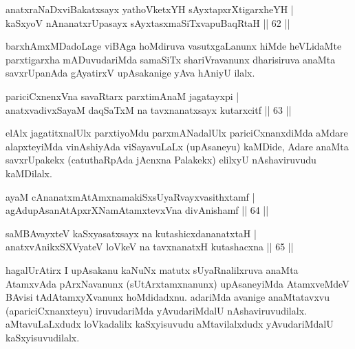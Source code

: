
\begin{shl}
anatxraNaDxviBakatxsayx yathoVketxYH sAyxtapxrXtigarxheYH | \\
kaSxyoV nAnanatxrUpasayx sAyxtasxmaSiTxvapuBaqRtaH \hfill||  62 || 
\end{shl}

\begin{artha} 
barxhAmxMDadoLage viBAga hoMdiruva vasutxgaLanunx hiMde heVLidaMte 
parxtigarxha mADuvudariMda samaSiTx shariVravanunx dharisiruva anaMta 
savxrUpanAda gAyatirxV upAsakanige yAva hAniyU ilalx.
\end{artha}


\begin{shl}
pariciCxnenxVna savaRtarx parxtimAnaM jagatayxpi | \\
anatxvadivxSayaM daqSaTxM na tavxnanatxsayx kutarxcitf \hfill||  63 || 
\end{shl}

\begin{artha} 
elAlx jagatitxnalUlx parxtiyoMdu parxmANadalUlx pariciCxnanxdiMda 
aMdare alapxteyiMda vinAshiyAda viSayavuLaLx (upAsaneyu) kaMDide, 
Adare anaMta savxrUpakekx (catuthaRpAda jAcnxna Palakekx) elilxyU 
nAshaviruvudu kaMDilalx.
\end{artha}


\begin{shl}
ayaM cAnanatxmAtAmxnamakiSxsUyaRvayxvasithxtamf  | \\
agAdupAsanAtApxrXNamAtamxtevxVna divAnishamf \hfill||  64 || 
\end{shl}

\begin{shl}
saMBAvayxteV kaSxyasatxsayx na kutashicxdananatxtaH | \\
anatxvAnikxSXVyateV loVkeV na tavxnanatxH kutashacxna \hfill||  65 || 
\end{shl}

\begin{artha} 
hagalUrAtirx I upAsakanu kaNuNx matutx sUyaRnalilxruva anaMta 
AtamxvAda pArxNavanunx (sUtArxtamxnanunx) upAsaneyiMda AtamxveMdeV 
BAvisi tAdAtamxyXvanunx hoMdidadxnu. adariMda avanige anaMtatavxvu 
(apariciCxnanxteyu) iruvudariMda yAvudariMdalU nAshaviruvudilalx. 
aMtavuLaLxdudx loVkadalilx kaSxyisuvudu aMtavilalxdudx yAvudariMdalU 
kaSxyisuvudilalx.
\end{artha}

